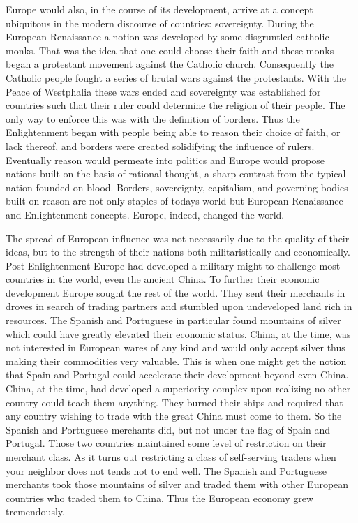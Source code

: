 \documentclass[a4paper, 12pt]{article}
\begin{document}
Europe would also, in the course of its development, arrive at a concept ubiquitous in the modern discourse of countries: sovereignty. During the European Renaissance a notion was developed by some disgruntled catholic monks. That was the idea that one could choose their faith and these monks began a protestant movement against the Catholic church. Consequently the Catholic people fought a series of brutal wars against the protestants. With the Peace of Westphalia these wars ended and sovereignty was established for countries such that their ruler could determine the religion of their people. The only way to enforce this was with the definition of borders. Thus the Enlightenment began with people being able to reason their choice of faith, or lack thereof, and borders were created solidifying the influence of rulers. Eventually reason would permeate into politics and Europe would propose nations built on the basis of rational thought, a sharp contrast from the typical nation founded on blood. Borders, sovereignty, capitalism, and governing bodies built on reason are not only staples of todays world but European Renaissance and Enlightenment concepts. Europe, indeed, changed the world.

The spread of European influence was not necessarily due to the quality of their ideas, but to the strength of their nations both militaristically and economically. Post-Enlightenment Europe had developed a military might to challenge most countries in the world, even the ancient China. To further their economic development Europe sought the rest of the world. They sent their merchants in droves in search of trading partners and stumbled upon undeveloped land rich in resources. The Spanish and Portuguese in particular found mountains of silver which could have greatly elevated their economic status. China, at the time, was not interested in European wares of any kind and would only accept silver thus making their commodities very valuable. This is when one might get the notion that Spain and Portugal could accelerate their development beyond even China. China, at the time, had developed a superiority complex upon realizing no other country could teach them anything. They burned their ships and required that any country wishing to trade with the great China must come to them. So the Spanish and Portuguese merchants did, but not under the flag of Spain and Portugal. Those two countries maintained some level of restriction on their merchant class. As it turns out restricting a class of self-serving traders when your neighbor does not tends not to end well. The Spanish and Portuguese merchants took those mountains of silver and traded them with other European countries who traded them to China. Thus the European economy grew tremendously.
\end{document}
